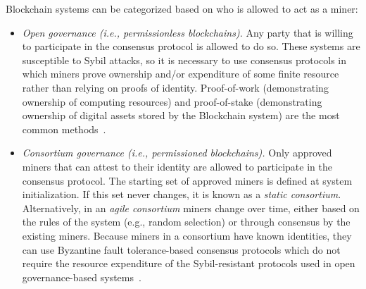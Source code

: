 
Blockchain systems can be categorized based on who is allowed to act as a miner:

\begin{itemize}

	\item \emph{Open governance (i.e., permissionless blockchains).}
	Any party that is willing to participate in the consensus protocol is allowed to do so.
	These systems are susceptible to Sybil attacks, so it is necessary to use 
	consensus protocols in which miners prove ownership and/or expenditure of 
	some finite resource rather than relying on proofs of identity.
	Proof-of-work (demonstrating ownership of computing resources) and proof-of-stake (demonstrating ownership of digital assets stored by the Blockchain system) are the most common methods~\cite{Bano17,garay2018consensus}.
	
	\item \emph{Consortium governance (i.e., permissioned blockchains).}
	Only approved miners that can attest to their identity are allowed to participate in the consensus protocol.
	The starting set of approved miners is defined at system initialization.
	If this set never changes, it is known as a \emph{static consortium}.
	Alternatively, in an \emph{agile consortium} miners change over time, either based on the rules of the system (e.g., random selection) or through consensus by the existing miners.
	Because miners in a consortium have known identities, they can use Byzantine fault tolerance-based consensus protocols which do not require the resource expenditure of the Sybil-resistant protocols used in open governance-based systems~\cite{Bano17,garay2018consensus}.
	
\end{itemize}

